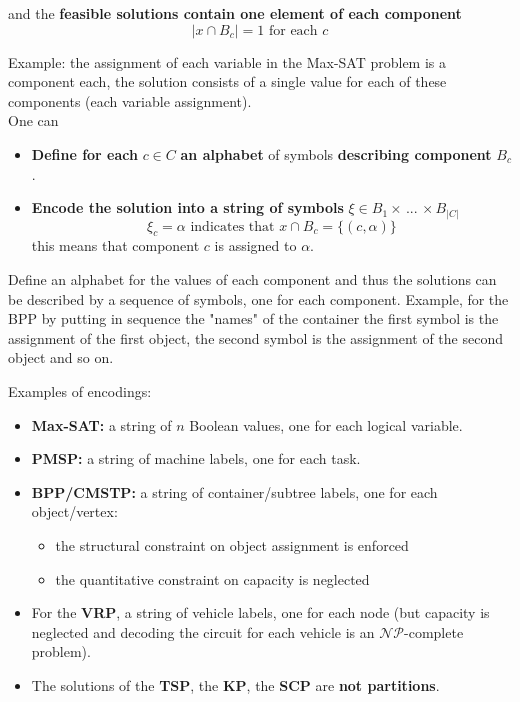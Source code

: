 and the \textbf{feasible solutions contain one element of each component}
$$ |x \cap B_c| = 1 \text{ for each } c$$

Example: the assignment of each variable in the Max-SAT problem is a component each, the solution consists of a single value for each of these components (each variable assignment).\\

One can
\begin{itemize}
	\item \textbf{Define for each} $c \in C$ \textbf{an alphabet} of symbols \textbf{describing component} $B_c$.\\
	
	\item \textbf{Encode the solution into a string of symbols} $\xi \in B_1 \times \, ... \, \times B_{|C |}$
	$$ \xi_c = \alpha \text{ indicates that } x \cap B_c = \{(c, \alpha)\} $$ 
	this means that component $c$ is assigned to $\alpha$.\\
\end{itemize}

Define an alphabet for the values of each component and thus the solutions can be described by a sequence of symbols, one for each component. Example, for the BPP by putting in sequence the "names" of the container the first symbol is the assignment of the first object, the second symbol is the assignment of the second object and so on.\\

\newpage

Examples of encodings:
\begin{itemize}
	\item \textbf{Max-SAT:} a string of $n$ Boolean values, one for each logical variable.\\
	
	\item \textbf{PMSP:} a string of machine labels, one for each task.\\
	
	\item \textbf{BPP/CMSTP:} a string of container/subtree labels, one for each object/vertex:
	\begin{itemize}
		\item the structural constraint on object assignment is enforced
		\item the quantitative constraint on capacity is neglected
	\end{itemize}
	\nn
	
	\item For the \textbf{VRP}, a string of vehicle labels, one for each node (but capacity is neglected and decoding the circuit for each vehicle is an $\mathcal{NP}$-complete problem).\\
	
	\item The solutions of the \textbf{TSP}, the \textbf{KP}, the \textbf{SCP} are \textbf{not partitions}.\\
\end{itemize}

